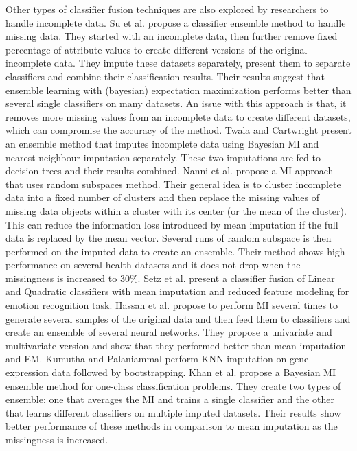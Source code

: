 \documentclass{iosart2c}
\begin{document}
Other types of classifier fusion techniques are also explored by researchers to handle incomplete data. 
Su et al. \cite{su2009making} propose a classifier ensemble method to handle missing data. They started with an incomplete data, then further remove fixed percentage of attribute values to create different versions of the original incomplete data. They impute these datasets separately, present them to separate classifiers and combine their classification results. Their results suggest that ensemble learning with (bayesian) expectation maximization performs better than several single classifiers on many datasets. An issue with this approach is that, it removes more missing values from an incomplete data to create different datasets, which can compromise the accuracy of the method. 
Twala and Cartwright \cite{twala2005ensemble} present an ensemble method that imputes incomplete data using Bayesian MI and nearest neighbour imputation separately. These two imputations are fed to decision trees and their results combined. 
Nanni et al.\cite{nanni2012classifier} propose a MI approach that uses random subspaces method. Their general idea is to cluster incomplete data into a fixed number of clusters and then replace the missing values of missing data objects within a cluster with its center (or the mean of the cluster). This can reduce the information loss introduced by mean imputation if the full data is replaced by the mean vector. Several runs of random subspace is then performed on the imputed data to create an ensemble. Their method shows high performance on several health datasets and it does not drop when the missingness is increased to $30\%$.
Setz et al.\cite{setz2009using} present a classifier fusion of Linear and Quadratic classifiers with mean imputation and reduced feature modeling for emotion recognition task. Hassan et al. \cite{hassan2007regression} propose to perform MI several times to generate several samples of the original data and then feed them to classifiers and create an ensemble of several neural networks. They propose a univariate and multivariate version and show that they performed better than mean imputation and EM. 
Kumutha and Palaniammal \cite{kumutha2013enhanced} perform KNN imputation on gene expression data followed by bootstrapping. Khan et al. \cite{khan2012bayesian} propose a Bayesian MI ensemble method for one-class classification problems. They create two types of ensemble: one that averages the MI and trains a single classifier and the other that learns different classifiers on multiple imputed datasets. Their results show better performance of these methods in comparison to mean imputation as the missingness is increased.
\end{document}
